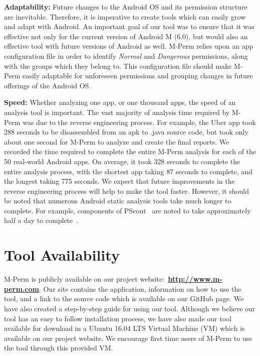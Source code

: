 \documentclass{sig-alternate-05-2015}
\begin{document}
\textbf{Adaptability:} Future changes to the Android OS and its permission structure are inevitable. Therefore, it is imperative to create tools which can easily grow and adapt with Android. An important goal of our tool was to ensure that it was effective not only for the current version of Android M (6.0), but would also an effective tool with future versions of Android as well. M-Perm relies upon an app configuration file in order to identify \emph{Normal} and \emph{Dangerous} permissions, along with the groups which they belong to. This configuration file should make M-Perm easily adaptable for unforeseen permissions and grouping changes in future offerings of the Android OS.

\textbf{Speed:} Whether analyzing one app, or one thousand apps, the speed of an analysis tool is important. The vast majority of analysis time required by M-Perm was due to the reverse engineering process. For example, the Uber app took 288 seconds to be disassembled from an apk to .java source code, but took only about one second for M-Perm to analyze and create the final reports. We recorded the time required to complete the entire M-Perm analysis for each of the 50 real-world Android apps. On average, it took 328 seconds to complete the entire analysis process, with the shortest app taking 87 seconds to complete, and the longest taking 775 seconds. We expect that future improvements in the reverse engineering process will help to make the tool faster. However, it should be noted that numerous Android static analysis tools take much longer to complete. For example, components of PScout~\cite{Au:2012:PAA:2382196.2382222} are noted to take approximately half a day to complete~\cite{PScout_GitHUb_URL}.





\section{Tool Availability}
\label{sec: toolavailability}

M-Perm is publicly available on our project website:~\textbf{\url{http://www.m-perm.com}}. Our site contains the application, information on how to use the tool, and a link to the source code which is available on our GitHub page. We have also created a step-by-step guide for using our tool. Although we believe our tool has an easy to follow installation process, we have also made our tool available for download in a Ubuntu 16.04 LTS Virtual Machine (VM) which is available on our project website. We encourage first time users of M-Perm to use the tool through this provided VM.
\end{document}
